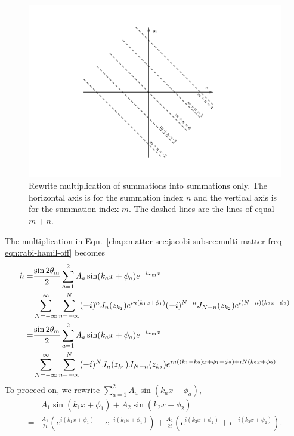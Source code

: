 \begin{figure}[!htbp]
    \centering
    \includegraphics[width=\textwidth]{chapters/assets/rabi/summation-algebra}
    \caption{Rewrite multiplication of summations into summations only. The horizontal axis is for the summation index $n$ and the vertical axis is for the summation index $m$. The dashed lines are the lines of equal $m+n$.}
    \label{chap:matter-sec:jacobi-subsec:multi-matter-freq-fig:summation-algebra}
\end{figure}
The multiplication in Eqn.~\ref{chap:matter-sec:jacobi-subsec:multi-matter-freq-eqn:rabi-hamil-off} becomes
\begin{align}
   h =& \frac{\sin 2\theta_\mm}{2} \sum_{a = 1}^2 A_a \sin (k_a x + \phi_a) e^{-i\omega_\mm x} \nonumber\\
   &\sum_{N=-\infty}^{\infty} \sum_{n=-\infty}^{N} (-i)^n J_n (z_{k_1}) e^{i n(k_1 x + \phi_1) } (-i)^{N-n} J_{N-n}(z_{k_2}) e^{i (N-n)(k_2 x + \phi_2)} \nonumber\\
   =&\frac{\sin 2\theta_\mm}{2} \sum_{a = 1}^2 A_a \sin (k_a x + \phi_a) e^{-i\omega_\mm x} \nonumber\\
   &\sum_{N=-\infty}^{\infty} \sum_{n=-\infty}^{N} (-i)^N J_{n}(z_{k_1}) J_{N-n}(z_{k_2}) e^{i n ((k_1-k_2)x + \phi_1 - \phi_2) + i N (k_2 x + \phi_2)}
   \label{chap:matter-sec:jacobi-subsec:multi-matter-freq-eqn:stimulated-multi-freq-hamiltonian-12-element}
\end{align}
To proceed on, we rewrite $\sum_{a = 1}^2 A_a \sin (k_a x + \phi_a)$,
\begin{align}
   &A_1 \sin(k_1 x +\phi_1) + A_2 \sin(k_2 x +\phi_2) \nonumber\\
   = & \frac{A_1}{2i}\left( e^{i(k_1 x + \phi_1)} +  e^{-i(k_1 x + \phi_1)} \right) + \frac{A_2}{2i} \left( e^{i(k_2 x + \phi_2)} +  e^{-i(k_2 x + \phi_2)} \right).
\end{align}
